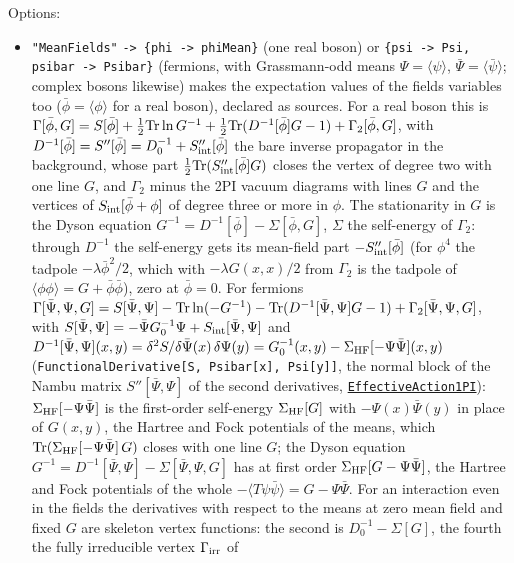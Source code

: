 \documentclass[11pt,a4paper]{article}
\newcommand{\pkg}[1]{\texttt{#1}}
\newcommand{\fnref}[1]{\hyperref[fn:#1]{\pkg{#1}}}
\newcommand{\opt}[1]{\texttt{"#1"}}
\begin{document}
Options:
\begin{itemize}
\item \opt{MeanFields} \pkg{-> \{phi -> phiMean\}} (one real boson) or \pkg{\{psi -> Psi, psibar -> Psibar\}} (fermions, with
  Grassmann-odd means $\Psi=\langle\psi\rangle$, $\bar\Psi=\langle\bar\psi\rangle$; complex bosons likewise) makes the expectation values of the fields variables too ($\bar\phi=\langle\phi\rangle$ for a real boson), declared as
  sources. For a real boson this is $\Gamma[\bar\phi,G]=S[\bar\phi]+\frac12{\rm Tr}\ln G^{-1}+\frac12{\rm Tr}(D^{-1}[\bar\phi]G-1)
  +\Gamma_2[\bar\phi,G]$, with $D^{-1}[\bar\phi]=S''[\bar\phi]=D_0^{-1}+S_{\rm int}''[\bar\phi]$ the bare inverse propagator in the
  background, whose part $\frac12{\rm Tr}(S_{\rm int}''[\bar\phi]G)$ closes the vertex of degree two with one line $G$, and $\Gamma_2$
  minus the 2PI vacuum diagrams with lines $G$ and the vertices of $S_{\rm int}[\bar\phi+\phi]$ of degree three or more in $\phi$. The
  stationarity in $G$ is the Dyson equation $G^{-1}=D^{-1}[\bar\phi]-\Sigma[\bar\phi,G]$, $\Sigma$ the self-energy of $\Gamma_2$: through
  $D^{-1}$ the self-energy gets its mean-field part $-S_{\rm int}''[\bar\phi]$ (for $\phi^4$ the tadpole $-\lambda\bar\phi^2/2$, which
  with $-\lambda G(x,x)/2$ from $\Gamma_2$ is the tadpole of $\langle\phi\phi\rangle=G+\bar\phi\bar\phi$), zero at $\bar\phi=0$. For fermions
  $\Gamma[\bar\Psi,\Psi,G]=S[\bar\Psi,\Psi]-{\rm Tr}\ln(-G^{-1})-{\rm Tr}(D^{-1}[\bar\Psi,\Psi]G-1)+\Gamma_2[\bar\Psi,\Psi,G]$, with
  $S[\bar\Psi,\Psi]=-\bar\Psi G_0^{-1}\Psi+S_{\rm int}[\bar\Psi,\Psi]$ and $D^{-1}[\bar\Psi,\Psi](x,y)=\delta^2S/\delta\bar\Psi(x)\,\delta\Psi(y)
  =G_0^{-1}(x,y)-\Sigma_{\rm HF}[-\Psi\bar\Psi](x,y)$ (\pkg{FunctionalDerivative[S, Psibar[x], Psi[y]]}, the normal block of the
  Nambu matrix $S''[\bar\Psi,\Psi]$ of the second derivatives, \fnref{EffectiveAction1PI}): $\Sigma_{\rm HF}[-\Psi\bar\Psi]$ is the first-order self-energy $\Sigma_{\rm HF}[G]$ with $-\Psi(x)\bar\Psi(y)$ in
  place of $G(x,y)$, the Hartree and Fock potentials of the means, which ${\rm Tr}(\Sigma_{\rm HF}[-\Psi\bar\Psi]\,G)$ closes with one
  line $G$; the Dyson equation $G^{-1}=D^{-1}[\bar\Psi,\Psi]-\Sigma[\bar\Psi,\Psi,G]$ has at first order $\Sigma_{\rm HF}[G-\Psi\bar\Psi]$,
  the Hartree and Fock potentials of the whole $-\langle T\psi\bar\psi\rangle=G-\Psi\bar\Psi$. For an interaction
  even in the fields the derivatives with respect to the means at zero mean field and fixed $G$ are skeleton vertex
  functions: the second is $D_0^{-1}-\Sigma[G]$, the fourth the fully irreducible vertex $\Gamma_{\rm irr}$ of

\end{itemize}
\end{document}
